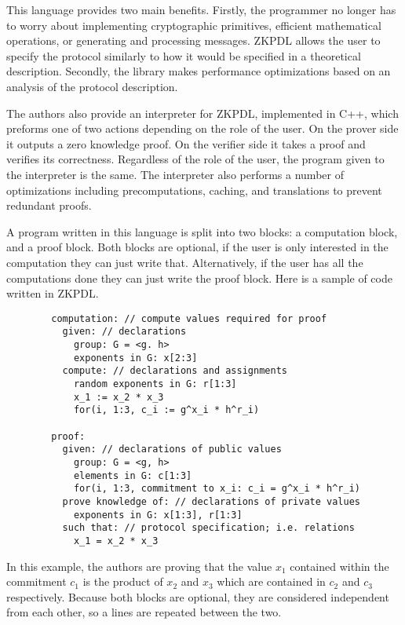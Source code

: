 \documentclass{sig-alternate}
\begin{document}
		This language provides two main benefits. Firstly, the programmer no longer 
		has to worry about implementing cryptographic primitives, efficient mathematical
		operations, or generating and processing messages. ZKPDL allows the user to
		specify the protocol similarly to how it would be specified in a theoretical
		description. Secondly, the library makes performance optimizations based on an
		analysis of the protocol description. 
		
		The authors also provide an interpreter for ZKPDL, implemented in C++, which
		preforms one of two actions depending on the role of the user. On the prover
		side it outputs a zero knowledge proof. On the verifier side it takes a proof
		and verifies its correctness. Regardless of the role of the user, the program
		given to the interpreter is the same. The interpreter also performs a number of
		optimizations including precomputations, caching, and translations to prevent
		redundant proofs. 
		
		A program written in this language is split into two blocks: a computation block,
		and a proof block. Both blocks are optional, if the user is only interested in the
		computation they can just write that. Alternatively, if the user has all the computations
		done they can just write the proof block. Here is a sample of code written in ZKPDL.
		
		\begin{verbatim}
		computation: // compute values required for proof
		  given: // declarations
		    group: G = <g. h>
		    exponents in G: x[2:3]
		  compute: // declarations and assignments
		    random exponents in G: r[1:3]
		    x_1 := x_2 * x_3
		    for(i, 1:3, c_i := g^x_i * h^r_i)
		    
		proof:
		  given: // declarations of public values
		    group: G = <g, h>
		    elements in G: c[1:3]
		    for(i, 1:3, commitment to x_i: c_i = g^x_i * h^r_i)
		  prove knowledge of: // declarations of private values
		    exponents in G: x[1:3], r[1:3]
		  such that: // protocol specification; i.e. relations
		    x_1 = x_2 * x_3
		\end{verbatim}
		
		In this example, the authors are proving that the value $x_{1}$ contained within
		the commitment $c_{1}$ is the product of $x_{2}$ and $x_{3}$ which are contained
		in $c_{2}$ and $c_{3}$ respectively. Because both blocks are optional, they are considered
		independent from each other, so a lines are repeated between the two.
		
\end{document}
